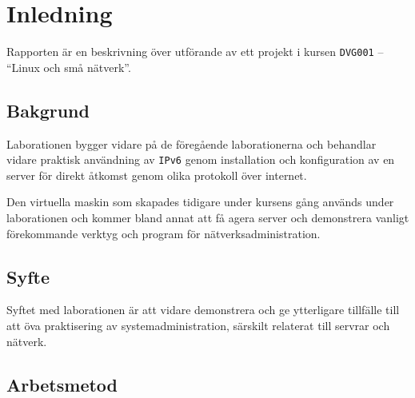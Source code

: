 %
%
%


\section{Inledning}
Rapporten är en beskrivning över utförande av ett projekt i kursen
\texttt{DVG001} -- ``Linux och små nätverk''.

\subsection{Bakgrund}
Laborationen bygger vidare på de föregående laborationerna och behandlar vidare
praktisk användning av \texttt{IPv6} genom installation och konfiguration av
en server för direkt åtkomst genom olika protokoll över internet.

Den virtuella maskin som skapades tidigare under kursens gång används under
laborationen och kommer bland annat att få agera server och demonstrera vanligt
förekommande verktyg och program för nätverksadministration.

\subsection{Syfte}
Syftet med laborationen är att vidare demonstrera och ge ytterligare tillfälle
till att öva praktisering av systemadministration, särskilt relaterat till
servrar och nätverk.

\subsection{Arbetsmetod}

